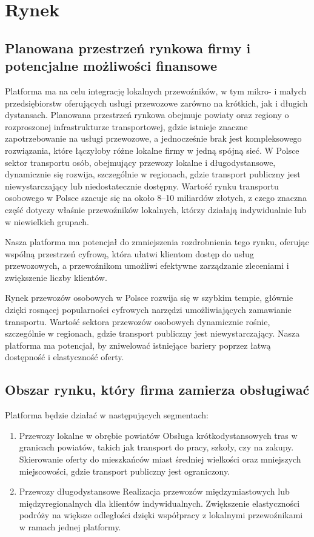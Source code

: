 \section{Rynek}
\subsection{Planowana przestrzeń rynkowa firmy i potencjalne możliwości finansowe}
Platforma ma na celu integrację lokalnych przewoźników, w tym mikro- i małych przedsiębiorstw oferujących usługi przewozowe zarówno na krótkich, jak i długich dystansach. Planowana przestrzeń rynkowa obejmuje powiaty oraz regiony o rozproszonej infrastrukturze transportowej, gdzie istnieje znaczne zapotrzebowanie na usługi przewozowe, a jednocześnie brak jest kompleksowego rozwiązania, które łączyłoby różne lokalne firmy w jedną spójną sieć.
W Polsce sektor transportu osób, obejmujący przewozy lokalne i długodystansowe, dynamicznie się rozwija, szczególnie w regionach, gdzie transport publiczny jest niewystarczający lub niedostatecznie dostępny. Wartość rynku transportu osobowego w Polsce szacuje się na około 8–10 miliardów złotych, z czego znaczna część dotyczy właśnie przewoźników lokalnych, którzy działają indywidualnie lub w niewielkich grupach.

Nasza platforma ma potencjał do zmniejszenia rozdrobnienia tego rynku, oferując wspólną przestrzeń cyfrową, która ułatwi klientom dostęp do usług przewozowych, a przewoźnikom umożliwi efektywne zarządzanie zleceniami i zwiększenie liczby klientów.

Rynek przewozów osobowych w Polsce rozwija się w szybkim tempie, głównie dzięki rosnącej popularności cyfrowych narzędzi umożliwiających zamawianie transportu. Wartość sektora przewozów osobowych dynamicznie rośnie, szczególnie w regionach, gdzie transport publiczny jest niewystarczający. Nasza platforma ma potencjał, by zniwelować istniejące bariery poprzez łatwą dostępność i elastyczność oferty.

\subsection{Obszar rynku, który firma zamierza obsługiwać}
Platforma będzie działać w następujących segmentach:
\begin{enumerate}
     
    \item Przewozy lokalne w obrębie powiatów
        Obsługa krótkodystansowych tras w granicach powiatów, takich jak transport do pracy, szkoły, czy na zakupy.
        Skierowanie oferty do mieszkańców miast średniej wielkości oraz mniejszych miejscowości, gdzie transport publiczny jest ograniczony.

    \item Przewozy długodystansowe
        Realizacja przewozów międzymiastowych lub międzyregionalnych dla klientów indywidualnych.
        Zwiększenie elastyczności podróży na większe odległości dzięki współpracy z lokalnymi przewoźnikami w ramach jednej platformy.
 
\end{enumerate}      

